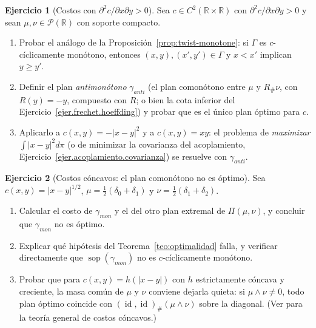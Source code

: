 \documentclass[12pt, a4paper]{amsbook}
\newcommand{\id}{\operatorname{id}}
\def\sop{\operatorname {\mathrm{sop}}}
\newcommand{\R}{{\mathbb R}}
\theoremstyle{remark}
\theoremstyle{definition}
\newtheorem{ejercicio}{Ejercicio}[chapter]
\numberwithin{section}{chapter}
\numberwithin{subsection}{section}
\numberwithin{equation}{section}
\numberwithin{figure}{chapter}
\begin{document}
\begin{ejercicio}[Costos con $\partial^2c/\partial x\partial y>0$]\label{ejer.1D.antimonotono}
Sea $c\in C^2(\R\times\R)$ con $\partial^2c/\partial x\partial y>0$ y sean
$\mu,\nu\in\mathcal P(\R)$ con soporte compacto.
\begin{enumerate}[label=(\alph*)]
\item Probar el análogo de la Proposición~\ref{prop:twist-monotone}: si
$\Gamma$ es $c$-cíclicamente monótono, entonces $(x,y),(x',y')\in\Gamma$ y
$x<x'$ implican $y\ge y'$.
\item Definir el plan \emph{antimonótono} $\gamma_{anti}$ (el plan
comonótono entre $\mu$ y $R_\#\nu$, con $R(y)=-y$, compuesto con $R$; o bien
la cota inferior del Ejercicio~\ref{ejer.frechet.hoeffding}) y probar que es
el único plan óptimo para $c$.
\item Aplicarlo a $c(x,y)=-|x-y|^2$ y a $c(x,y)=xy$: el problema de
\emph{maximizar} $\int|x-y|^2d\pi$ (o de minimizar la covarianza del
acoplamiento, Ejercicio~\ref{ejer.acoplamiento.covarianza}) se resuelve con
$\gamma_{anti}$.
\end{enumerate}
\end{ejercicio}

\begin{ejercicio}[Costos cóncavos: el plan comonótono no es óptimo]\label{ejer.1D.concavo}
Sea $c(x,y)=|x-y|^{1/2}$, $\mu=\frac12(\delta_0+\delta_1)$ y
$\nu=\frac12(\delta_1+\delta_2)$.
\begin{enumerate}[label=(\alph*)]
\item Calcular el costo de $\gamma_{mon}$ y el del otro plan extremal de
$\Pi(\mu,\nu)$, y concluir que $\gamma_{mon}$ no es óptimo.
\item Explicar qué hipótesis del Teorema~\ref{teo:optimalidad} falla, y
verificar directamente que $\sop(\gamma_{mon})$ no es $c$-cíclicamente
monótono.
\item Probar que para $c(x,y)=h(|x-y|)$ con $h$ estrictamente cóncava y
creciente, la masa común de $\mu$ y $\nu$ conviene dejarla quieta: si
$\mu\wedge\nu\ne0$, todo plan óptimo coincide con $(\id,\id)_\#(\mu\wedge\nu)$
sobre la diagonal. (Ver \cite[Sec.~3.3.2]{Santambrogio} para la teoría
general de costos cóncavos.)
\end{enumerate}
\end{ejercicio}
\end{document}
